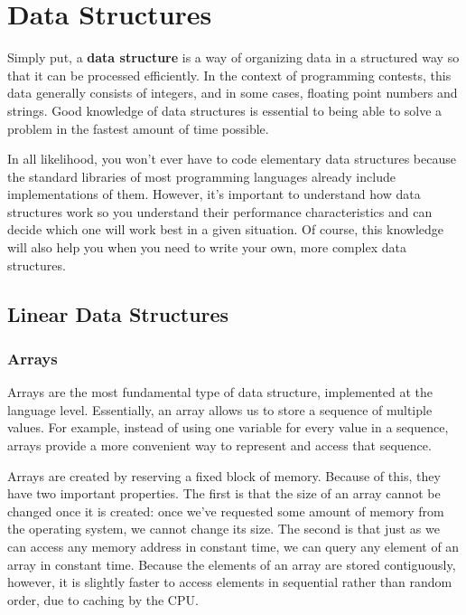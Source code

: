\chapter{Data Structures}

Simply put, a \textbf{data structure} is a way of organizing data in a structured way so that it can be processed efficiently. In the context of programming contests, this data generally consists of integers, and in some cases, floating point numbers and strings. Good knowledge of data structures is essential to being able to solve a problem in the fastest amount of time possible.

In all likelihood, you won't ever have to code elementary data structures because the standard libraries of most programming languages already include implementations of them. However, it's important to understand how data structures work so you understand their performance characteristics and can decide which one will work best in a given situation. Of course, this knowledge will also help you when you need to write your own, more complex data structures.


\section{Linear Data Structures}

\subsection{Arrays}

Arrays are the most fundamental type of data structure, implemented at the language level. Essentially, an array allows us to store a sequence of multiple values. For example, instead of using one variable for every value in a sequence, arrays provide a more convenient way to represent and access that sequence.

Arrays are created by reserving a fixed block of memory. Because of this, they have two important properties. The first is that the size of an array cannot be changed once it is created: once we've requested some amount of memory from the operating system, we cannot change its size. The second is that just as we can access any memory address in constant time, we can query any element of an array in constant time. Because the elements of an array are stored contiguously, however, it is slightly faster to access elements in sequential rather than random order, due to caching by the CPU.

